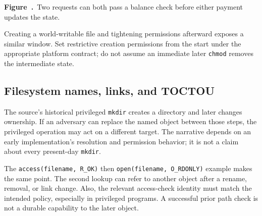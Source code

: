 \documentclass[11pt,a4paper]{article}
\numberwithin{figure}{section}
\newcommand{\diagramcaption}[1]{\par\smallskip\refstepcounter{figure}\begin{center}\small\textbf{Figure~\thefigure.}~#1\end{center}}
\begin{document}
\begin{center}\end{center}
\diagramcaption{Two requests can both pass a balance check before either payment updates the state.}

Creating a world-writable file and tightening permissions afterward exposes a similar window. Set restrictive creation permissions from the start under the appropriate platform contract; do not assume an immediate later \texttt{chmod} removes the intermediate state.

\subsection{Filesystem names, links, and TOCTOU}
The source's historical privileged \texttt{mkdir} creates a directory and later changes ownership. If an adversary can replace the named object between those steps, the privileged operation may act on a different target. The narrative depends on an early implementation's resolution and permission behavior; it is not a claim about every present-day \texttt{mkdir}.

The \texttt{access(filename, R\_OK)} then \texttt{open(filename, O\_RDONLY)} example makes the same point. The second lookup can refer to another object after a rename, removal, or link change. Also, the relevant access-check identity must match the intended policy, especially in privileged programs. A successful prior path check is not a durable capability to the later object.
\end{document}
